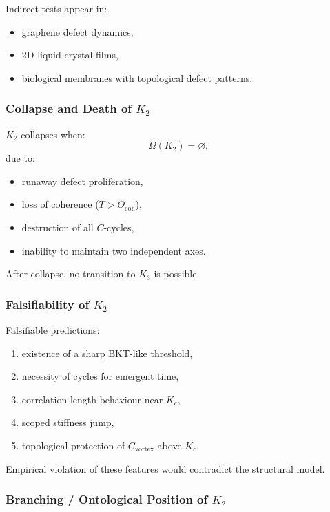 Indirect tests appear in:
\begin{itemize}
    \item graphene defect dynamics,
    \item 2D liquid-crystal films,
    \item biological membranes with topological defect patterns.
\end{itemize}

\subsubsection{Collapse and Death of \texorpdfstring{$K_2$}{K_2}}

$K_2$ collapses when:
\[
\Omega(K_2) = \varnothing,
\]
due to:
\begin{itemize}
    \item runaway defect proliferation,
    \item loss of coherence ($T > \Theta_{\mathrm{coh}}$),
    \item destruction of all $C$-cycles,
    \item inability to maintain two independent axes.
\end{itemize}

After collapse, no transition to $K_3$ is possible.

\subsubsection{Falsifiability of \texorpdfstring{$K_2$}{K_2}}

Falsifiable predictions:
\begin{enumerate}
    \item existence of a sharp BKT-like threshold,
    \item necessity of cycles for emergent time,
    \item correlation-length behaviour near $K_c$,
    \item scoped stiffness jump,
    \item topological protection of $C_{\mathrm{vortex}}$ above $K_c$.
\end{enumerate}

Empirical violation of these features would contradict the structural
model.

\subsubsection{Branching / Ontological Position of \texorpdfstring{$K_2$}{K_2}}

